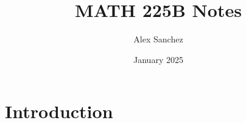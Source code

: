 \documentclass{article}
\title{MATH 225B Notes}
\author{Alex Sanchez}
\date{January 2025}
\begin{document}
\maketitle

\section{Introduction}
\end{document}
